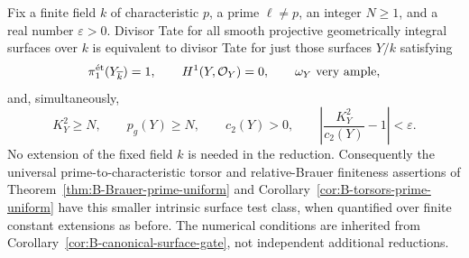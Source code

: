 \begin{theorem}
\label{thm:B-simply-connected-surface-gate}
Fix a finite field \(k\) of characteristic \(p\), a prime
\(\ell\ne p\), an integer \(N\geq1\), and a real number
\(\varepsilon>0\).  Divisor Tate for all smooth projective
geometrically integral surfaces over \(k\) is equivalent to
divisor Tate for just those surfaces \(Y/k\) satisfying
\[
 \pi_1^{\mathrm{\acute et}}(Y_{\overline k})=1,
 \qquad H^1(Y,\mathcal O_Y)=0,
 \qquad \omega_Y\text{ very ample},
\]
and, simultaneously,
\[
 K_Y^2\geq N,\qquad p_g(Y)\geq N,\qquad c_2(Y)>0,
 \qquad \left|\frac{K_Y^2}{c_2(Y)}-1\right|<\varepsilon.
\]
No extension of the fixed field \(k\) is needed in the reduction.
Consequently the universal prime-to-characteristic torsor and
relative-Brauer finiteness assertions of
Theorem~\ref{thm:B-Brauer-prime-uniform} and
Corollary~\ref{cor:B-torsors-prime-uniform} have this smaller
intrinsic surface test class, when quantified over finite constant
extensions as before.  The numerical conditions are inherited from
Corollary~\ref{cor:B-canonical-surface-gate}, not independent
additional reductions.
\end{theorem}
